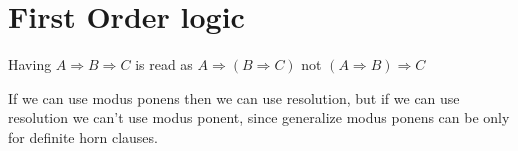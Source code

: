 \documentclass[10pt,a4paper]{article}
\begin{document}
\newpage
\section{First Order logic}
Having $A\Rightarrow B \Rightarrow C$ is read as $A\Rightarrow (B \Rightarrow C)$ not $(A\Rightarrow B) \Rightarrow C$

If we can use   modus ponens then we can use resolution, but if we can use resolution  we can't use modus ponent, since generalize modus ponens can be only for definite horn clauses.
\end{document}
